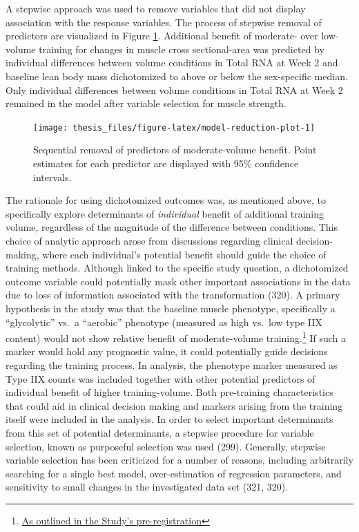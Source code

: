 \documentclass[twoside,10pt]{gihclass} %
\begin{document}
A stepwise approach was used to remove variables that did not display association with the response variables. The process of stepwise removal of predictors are visualized in Figure \ref{fig:model-reduction-plot}.
Additional benefit of moderate- over low-volume training for changes in muscle cross sectional-area was predicted by individual differences between volume conditions in Total RNA at Week 2 and baseline lean body mass dichotomized to above or below the sex-specific median.
Only individual differences between volume conditions in Total RNA at Week 2 remained in the model after variable selection for muscle strength.
\begin{figure}

{\centering \texttt{[image: thesis\_files/figure-latex/model-reduction-plot-1]} 

}

\caption[Step-wise variable selection of determinants of moderate- over low-volume training benefit.]{Sequential removal of predictors of moderate-volume benefit. Point estimates for each predictor are displayed with 95\% confidence intervals.}\label{fig:model-reduction-plot}
\end{figure}
The rationale for using dichotomized outcomes was, as mentioned above, to specifically explore determinants of \emph{individual} benefit of additional training volume, regardless of the magnitude of the difference between conditions.
This choice of analytic approach arose from discussions regarding clinical decision-making, where each individual's potential benefit should guide the choice of training methods.
Although linked to the specific study question, a dichotomized outcome variable could potentially mask other important associations in the data due to loss of information associated with the transformation
(320).
A primary hypothesis in the study was that the baseline muscle phenotype, specifically a ``glycolytic'' vs.~a ``aerobic'' phenotype (measured as high vs.~low type IIX content) would not show relative benefit of moderate-volume training.\footnote{\href{https://clinicaltrials.gov/ct2/show/NCT02179307?term=lillehammer\&draw=2\&rank=9}{As outlined in the Study's pre-registration}}
If such a marker would hold any prognostic value, it could potentially guide decisions regarding the training process.
In analysis, the phenotype marker measured as Type IIX counts was included together with other potential predictors of individual benefit of higher training-volume.
Both pre-training characteristics that could aid in clinical decision making and markers arising from the training itself were included in the analysis.
In order to select important determinants from this set of potential determinants, a stepwise procedure for variable selection, known as purposeful selection was used
(299).
Generally, stepwise variable selection has been criticized for a number of reasons, including arbitrarily searching for a single best model, over-estimation of regression parameters, and sensitivity to small changes in the investigated data set
(321, 320).
\end{document}
